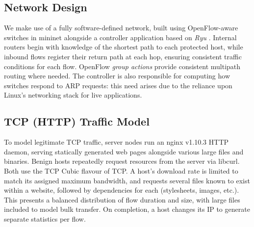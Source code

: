 \documentclass[10pt, times, conference, letterpaper]{IEEEtran}
\begin{document}
\subsection{Network Design}
We make use of a fully software-defined network, built using OpenFlow-aware switches in mininet alongside a controller application based on \emph{Ryu} \cite{ryu}.
Internal routers begin with knowledge of the shortest path to each protected host, while inbound flows register their return path at each hop, ensuring consistent traffic conditions for each flow.
OpenFlow \emph{group actions} provide consistent multipath routing where needed. 
The controller is also responsible for computing how switches respond to ARP requests: this need arises due to the reliance upon Linux's networking stack for live applications.

\subsection{TCP (HTTP) Traffic Model}
To model legitimate TCP traffic, server nodes run an nginx v1.10.3 HTTP daemon, serving statically generated web pages alongside various large files and binaries.
Benign hosts repeatedly request resources from the server via libcurl.
Both use the TCP Cubic \cite{rfc8312} flavour of TCP.
A host's download rate is limited to match its assigned maximum bandwidth, and requests several files known to exist within a website, followed by dependencies for each (stylesheets, images, etc.).
This presents a balanced distribution of flow duration and size, with large files included to model bulk transfer.
On completion, a host changes its IP to generate separate statistics per flow.
\end{document}
